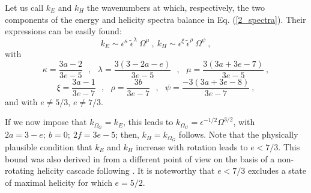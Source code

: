 \documentclass[aps,amsmath,amssymb,floatfix,showpacs]{revtex4}
\begin{document}
Let us call $k_{E}$ and $k_H$ the wavenumbers at which, respectively, the two components of the energy and helicity spectra balance in Eq. (\ref{2_spectra}). Their expressions can be easily found:
\begin{equation}
k_{E}\sim \epsilon^{\kappa}\  \tilde \epsilon^{\lambda} \ \Omega^{\mu}  \  , \ 
k_{H}\sim \epsilon^{\xi}\  \tilde \epsilon^{\rho} \ \Omega^{\psi}  \  , 
\label{zeman_G4}\end{equation}
with
\begin{equation}
\kappa={\frac{3a-2}{3e-5}}\ \ \ , \ \ \ 
\lambda={\frac{3(3-2a-e)}{3e-5}} \  \ \ , \ \ \ 
\mu={\frac{3(3a+3e-7)}{3e-5}} \ ,
\label{zeman_G5}\end{equation}
\begin{equation}
\xi={\frac{3a-1}{3e-7}}\ \ \ , \ \ \ \rho={\frac{3b}{3e-7}} \ \ \ , \ \ \  \psi={\frac{-3(3a+3e-8)}{3e-7}}  \  ,
\label{zeman_G6}\end{equation}
and with $e\not= 5/3$, $e\not= 7/3$.

If we now impose that $k_{{\Omega}_G}=k_E$, this leads to $k_{{\Omega}_G} = \epsilon^{-1/2} \Omega^{3/2}$, with $2a=3-e; \ b=0; \ 2f=3e-5$; then, $k_H=k_{{\Omega}_G}$ follows. Note that the physically plausible condition that $k_{E}$ and $k_{H}$ increase with rotation leads to $e <7/3$. This bound was also derived in \cite{chakra07b} from a different point of view on the basis of a non-rotating helicity cascade following \cite{brissaud}. It is noteworthy that $e<7/3$ excludes a state of maximal helicity for which $e=5/2$.
\end{document}
